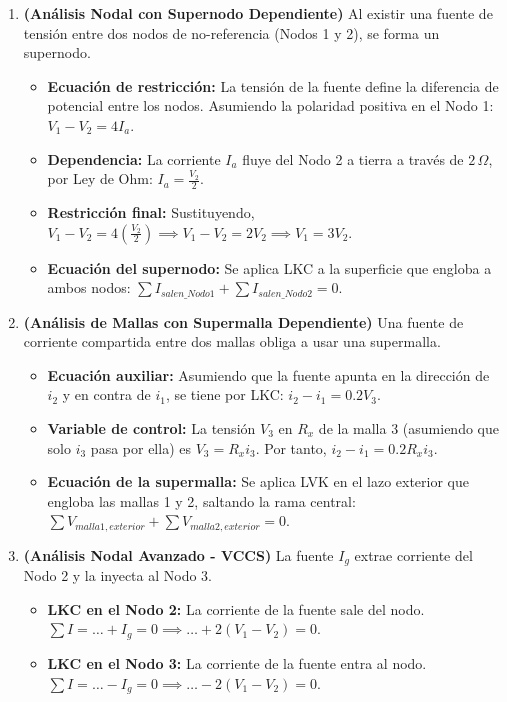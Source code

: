 \documentclass[12pt, a4paper]{article}
\begin{document}
\begin{enumerate}[leftmargin=*, itemsep=2em]
    \item \textbf{(Análisis Nodal con Supernodo Dependiente)} 
    Al existir una fuente de tensión entre dos nodos de no-referencia (Nodos 1 y 2), se forma un supernodo. 
    \begin{itemize}
        \item \textbf{Ecuación de restricción:} La tensión de la fuente define la diferencia de potencial entre los nodos. Asumiendo la polaridad positiva en el Nodo 1: $V_1 - V_2 = 4 I_a$.
        \item \textbf{Dependencia:} La corriente $I_a$ fluye del Nodo 2 a tierra a través de $2\,\Omega$, por Ley de Ohm: $I_a = \frac{V_2}{2}$.
        \item \textbf{Restricción final:} Sustituyendo, $V_1 - V_2 = 4 \left(\frac{V_2}{2}\right) \implies V_1 - V_2 = 2 V_2 \implies V_1 = 3 V_2$.
        \item \textbf{Ecuación del supernodo:} Se aplica LKC a la superficie que engloba a ambos nodos: $\sum I_{salen\_Nodo1} + \sum I_{salen\_Nodo2} = 0$.
    \end{itemize}

    \item \textbf{(Análisis de Mallas con Supermalla Dependiente)}
    Una fuente de corriente compartida entre dos mallas obliga a usar una supermalla.
    \begin{itemize}
        \item \textbf{Ecuación auxiliar:} Asumiendo que la fuente apunta en la dirección de $i_2$ y en contra de $i_1$, se tiene por LKC: $i_2 - i_1 = 0.2 V_3$.
        \item \textbf{Variable de control:} La tensión $V_3$ en $R_x$ de la malla 3 (asumiendo que solo $i_3$ pasa por ella) es $V_3 = R_x i_3$. Por tanto, $i_2 - i_1 = 0.2 R_x i_3$.
        \item \textbf{Ecuación de la supermalla:} Se aplica LVK en el lazo exterior que engloba las mallas 1 y 2, saltando la rama central: $\sum V_{malla1, exterior} + \sum V_{malla2, exterior} = 0$.
    \end{itemize}

    \item \textbf{(Análisis Nodal Avanzado - VCCS)}
    La fuente $I_g$ extrae corriente del Nodo 2 y la inyecta al Nodo 3.
    \begin{itemize}
        \item \textbf{LKC en el Nodo 2:} La corriente de la fuente sale del nodo. $\sum I = \dots + I_g = 0 \implies \dots + 2(V_1 - V_2) = 0$.
        \item \textbf{LKC en el Nodo 3:} La corriente de la fuente entra al nodo. $\sum I = \dots - I_g = 0 \implies \dots - 2(V_1 - V_2) = 0$.
    \end{itemize}


\end{enumerate}
\end{document}
